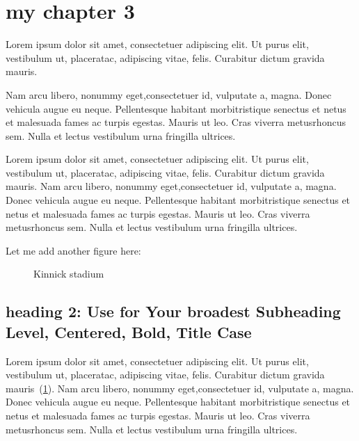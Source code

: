 \section{my chapter 3}

Lorem ipsum dolor sit amet, consectetuer adipiscing elit.  Ut purus elit, vestibulum ut, placeratac,  adipiscing vitae,  felis.   Curabitur dictum gravida mauris.

Nam arcu libero,  nonummy eget,consectetuer id, vulputate a, magna. Donec vehicula augue eu neque. Pellentesque habitant morbitristique senectus et netus et malesuada fames ac turpis egestas. Mauris ut leo. Cras viverra metusrhoncus sem.  Nulla et lectus vestibulum urna fringilla ultrices. \textcite{zuo2017state}

Lorem ipsum dolor sit amet, consectetuer adipiscing elit.  Ut purus elit, vestibulum ut, placeratac,  adipiscing vitae,  felis.   Curabitur dictum gravida mauris.
Nam arcu libero,  nonummy eget,consectetuer id, vulputate a, magna. Donec vehicula augue eu neque. Pellentesque habitant morbitristique senectus et netus et malesuada fames ac turpis egestas. Mauris ut leo. Cras viverra metusrhoncus sem.  Nulla et lectus vestibulum urna fringilla ultrices.

Let me add another figure here:

\begin{figure}[h]
  \centering
  \captionsetup{width=0.7\linewidth} %
  \caption{Kinnick stadium}
  \label{fig:2}
\end{figure}

\subsection{heading 2: Use for Your broadest Subheading Level, Centered, Bold, Title Case}

Lorem ipsum dolor sit amet, consectetuer adipiscing elit.  Ut purus elit, vestibulum ut, placeratac,  adipiscing vitae,  felis.   Curabitur dictum gravida mauris~(\cref{fig:2}).
Nam arcu libero,  nonummy eget,consectetuer id, vulputate a, magna. Donec vehicula augue eu neque. Pellentesque habitant morbitristique senectus et netus et malesuada fames ac turpis egestas. Mauris ut leo. Cras viverra metusrhoncus sem.  Nulla et lectus vestibulum urna fringilla ultrices.

